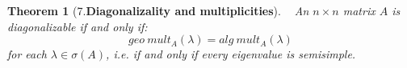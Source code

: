\documentclass[10.5pt]{article}
\newtheorem{theo}{Theorem}
\begin{document}
\begin{theo}[7.\textbf{Diagonalizality and multiplicities}]
~ An $n\times n$ matrix $A$ is diagonalizable if and only if:
$$geo\ mult_{A}(\lambda )=alg\ mult_{A}(\lambda )$$
for each $\lambda \in \sigma (A)$, i.e. if and only if every eigenvalue is semisimple.
\end{theo}
\pagebreak
\end{document}
